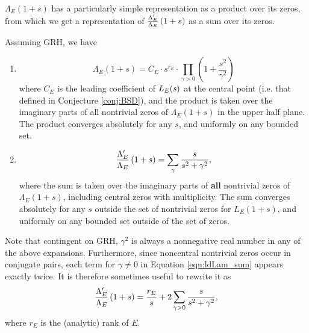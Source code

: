 $\Lambda_E(1+s)$ has a particularly simple representation as a product over its zeros, from which we get a representation of $\frac{\Lambda_E^{\prime}}{\Lambda_E}\left(1+s\right)$ as a sum over its zeros.
\begin{proposition}\label{prop:logderiv_zero_rep}  Assuming GRH, we have
\begin{enumerate}
\item \begin{equation}\label{eqn:Lams_prod}
\Lambda_E(1+s) = C_E\cdot s^{r_E} \cdot \prod_{\gamma > 0} \left(1+\frac{s^2}{\gamma^2}\right) 
\end{equation}
where $C_E$ is the leading coefficient of $L_E(s)$ at the central point (i.e. that defined in Conjecture \ref{conj:BSD}), and the product is taken over the imaginary parts of all nontrivial zeros of $\Lambda_E(1+s)$ in the upper half plane. The product converges absolutely for any $s$, and uniformly on any bounded set.
\item \begin{equation}\label{eqn:ldLam_sum}
\frac{\Lambda_E^{\prime}}{\Lambda_E}\left(1+s\right) = \sum_{\gamma} \frac{s}{s^2+\gamma^2}, 
\end{equation}
where the sum is taken over the imaginary parts of {\bf all} nontrivial zeros of $\Lambda_E(1+s)$, including central zeros with multiplicity. The sum converges absolutely for any $s$ outside the set of nontrivial zeros for $L_E(1+s)$, and uniformly on any bounded set outside of the set of zeros. \\
\end{enumerate}
\end{proposition}

Note that contingent on GRH, $\gamma^2$ is always a nonnegative real number in any of the above expansions. Furthermore,  since noncentral nontrivial zeros occur in conjugate pairs, each term for $\gamma \ne 0$ in Equation \ref{eqn:ldLam_sum} appears exactly twice. It is therefore sometimes useful to rewrite it as
\begin{equation}\label{eqn:ldLam_sum_v2}
\frac{\Lambda_E^{\prime}}{\Lambda_E}\left(1+s\right) = \frac{r_E}{s} + 2 \sum_{\gamma>0} \frac{s}{s^2+\gamma^2},
\end{equation}
where $r_E$ is the (analytic) rank of $E$.

